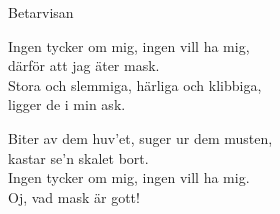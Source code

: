 \begin{song}{Betarvisan}
    
	
	Ingen tycker om mig, ingen vill ha mig,\\
	därför att jag äter mask.\\
	Stora och slemmiga, härliga och klibbiga,\\
	ligger de i min ask.
	
	Biter av dem huv'et, suger ur dem musten,\\
	kastar se'n skalet bort.\\
	Ingen tycker om mig, ingen vill ha mig.\\
	Oj, vad mask är gott!
	
\end{song}
